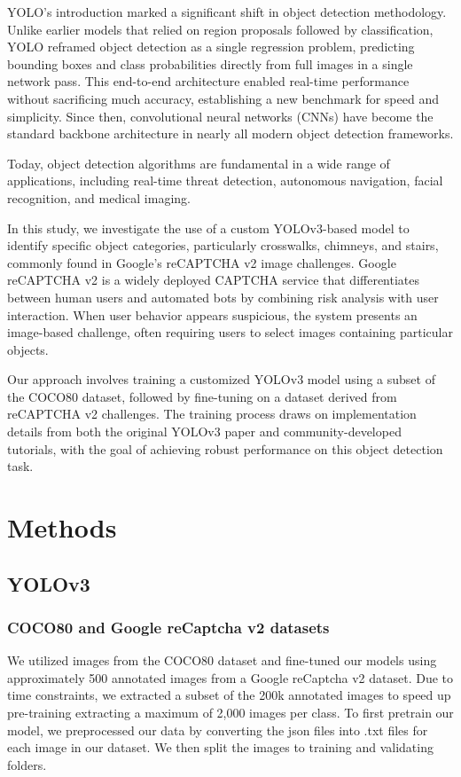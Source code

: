 \documentclass{article}
\begin{document}
YOLO's introduction marked a significant shift in object detection methodology. Unlike earlier models that relied on region proposals followed by classification, YOLO reframed object detection as a single regression problem, predicting bounding boxes and class probabilities directly from full images in a single network pass. This end-to-end architecture enabled real-time performance without sacrificing much accuracy, establishing a new benchmark for speed and simplicity. Since then, convolutional neural networks (CNNs) have become the standard backbone architecture in nearly all modern object detection frameworks.

Today, object detection algorithms are fundamental in a wide range of applications, including real-time threat detection, autonomous navigation, facial recognition, and medical imaging. 

In this study, we investigate the use of a custom YOLOv3-based model to identify specific object categories, particularly crosswalks, chimneys, and stairs, commonly found in Google’s reCAPTCHA v2 image challenges. Google reCAPTCHA v2 is a widely deployed CAPTCHA service that differentiates between human users and automated bots by combining risk analysis with user interaction. When user behavior appears suspicious, the system presents an image-based challenge, often requiring users to select images containing particular objects.

Our approach involves training a customized YOLOv3 model using a subset of the COCO80 dataset, followed by fine-tuning on a dataset derived from reCAPTCHA v2 challenges. The training process draws on implementation details from both the original YOLOv3 paper and community-developed tutorials, with the goal of achieving robust performance on this object detection task.
\section{Methods}
\label{methods}
\subsection{YOLOv3}
\subsubsection{COCO80 and Google reCaptcha v2 datasets}
We utilized images from the COCO80 dataset and fine-tuned our models using approximately 500 annotated images from a Google reCaptcha v2 dataset. Due to time constraints, we extracted a subset of the 200k annotated images to speed up pre-training extracting a maximum of 2,000 images per class. To first pretrain our model, we preprocessed our data by converting the json files into .txt files for each image in our dataset. We then split the images to training and validating folders. 
\end{document}
